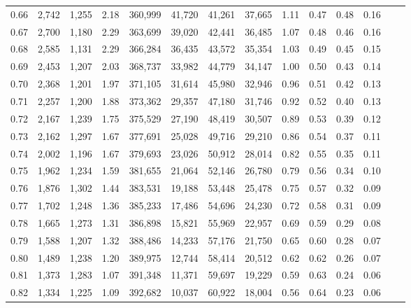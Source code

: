 \begin{tabular}{rrrrrrrrrrrrrr}
0.66 &  2,742 &  1,255 &    2.18 &  360,999 &   41,720 &  41,261 &  37,665 &  1.11 &  0.47 &  0.48 &      0.16 \\
0.67 &  2,700 &  1,180 &    2.29 &  363,699 &   39,020 &  42,441 &  36,485 &  1.07 &  0.48 &  0.46 &      0.16 \\
0.68 &  2,585 &  1,131 &    2.29 &  366,284 &   36,435 &  43,572 &  35,354 &  1.03 &  0.49 &  0.45 &      0.15 \\
0.69 &  2,453 &  1,207 &    2.03 &  368,737 &   33,982 &  44,779 &  34,147 &  1.00 &  0.50 &  0.43 &      0.14 \\
0.70 &  2,368 &  1,201 &    1.97 &  371,105 &   31,614 &  45,980 &  32,946 &  0.96 &  0.51 &  0.42 &      0.13 \\
0.71 &  2,257 &  1,200 &    1.88 &  373,362 &   29,357 &  47,180 &  31,746 &  0.92 &  0.52 &  0.40 &      0.13 \\
0.72 &  2,167 &  1,239 &    1.75 &  375,529 &   27,190 &  48,419 &  30,507 &  0.89 &  0.53 &  0.39 &      0.12 \\
0.73 &  2,162 &  1,297 &    1.67 &  377,691 &   25,028 &  49,716 &  29,210 &  0.86 &  0.54 &  0.37 &      0.11 \\
0.74 &  2,002 &  1,196 &    1.67 &  379,693 &   23,026 &  50,912 &  28,014 &  0.82 &  0.55 &  0.35 &      0.11 \\
0.75 &  1,962 &  1,234 &    1.59 &  381,655 &   21,064 &  52,146 &  26,780 &  0.79 &  0.56 &  0.34 &      0.10 \\
0.76 &  1,876 &  1,302 &    1.44 &  383,531 &   19,188 &  53,448 &  25,478 &  0.75 &  0.57 &  0.32 &      0.09 \\
0.77 &  1,702 &  1,248 &    1.36 &  385,233 &   17,486 &  54,696 &  24,230 &  0.72 &  0.58 &  0.31 &      0.09 \\
0.78 &  1,665 &  1,273 &    1.31 &  386,898 &   15,821 &  55,969 &  22,957 &  0.69 &  0.59 &  0.29 &      0.08 \\
0.79 &  1,588 &  1,207 &    1.32 &  388,486 &   14,233 &  57,176 &  21,750 &  0.65 &  0.60 &  0.28 &      0.07 \\
0.80 &  1,489 &  1,238 &    1.20 &  389,975 &   12,744 &  58,414 &  20,512 &  0.62 &  0.62 &  0.26 &      0.07 \\
0.81 &  1,373 &  1,283 &    1.07 &  391,348 &   11,371 &  59,697 &  19,229 &  0.59 &  0.63 &  0.24 &      0.06 \\
0.82 &  1,334 &  1,225 &    1.09 &  392,682 &   10,037 &  60,922 &  18,004 &  0.56 &  0.64 &  0.23 &      0.06 \\

\end{tabular}
